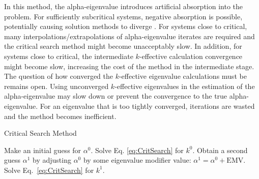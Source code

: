In this method, the alpha-eigenvalue introduces artificial absorption into the problem. For sufficiently subcritical systems, negative absorption is possible, potentially causing solution methods to diverge \cite{hill_efficient_1983}. For systems close to critical, many interpolations/extrapolations of alpha-eigenvalue iterates are required and the critical search method might become unacceptably slow. In addition, for systems close to critical, the intermediate $k$-effective calculation convergence might become slow, increasing the cost of the method in the intermediate stage. The question of how converged the $k$-effective eigenvalue calculations must be remains open. Using unconverged $k$-effective eigenvalues in the estimation of the alpha-eigenvalue may slow down or prevent the convergence to the true alpha-eigenvalue. For an eigenvalue that is too tightly converged, iterations are wasted and the method becomes inefficient.

\begin{algorithm}[H]
				\caption{Critical Search Method \cite{hill_efficient_1983}}
				\begin{algorithmic}[1]
					\STATE Make an initial guess for $\alpha^{0}$.
					\STATE Solve Eq. \ref{eq:CritSearch} for $k^{0}$.
					\STATE Obtain a second guess $\alpha^{1}$ by adjusting $\alpha^{0}$ by some eigenvalue modifier value: $\alpha^{1} = \alpha^{0} + \text{EMV}$.
					\STATE Solve Eq.~\ref{eq:CritSearch} for $k^{1}$.
					\ENDWHILE
				\end{algorithmic}
				\label{algo:critsearch}
\end{algorithm}


